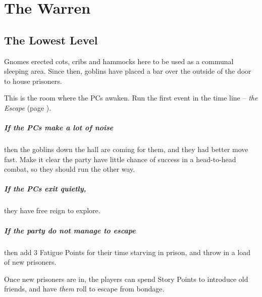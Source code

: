 \chapter{The Warren}

\begin{figure*}[t]
	
\end{figure*}

\section{The Lowest Level}

\begin{multicols}{2}
\setcounter{list}{0}

\label{entrycell}

\begin{exampletext}

	Gnomes erected cots, cribs and hammocks here to be used as a communal sleeping area.
	Since then, goblins have placed a bar over the outside of the door to house prisoners.

\end{exampletext}

This is the room where the PCs awaken.
Run the first event in the time line -- \textit{the Escape} (page \pageref{escape}).

\paragraph{If the PCs make a lot of noise}
then the goblins down the hall are coming for them, and they had better move fast.
Make it clear the party have little chance of success in a head-to-head combat, so they should run the other way.

\paragraph{If the PCs exit quietly,}
they have free reign to explore.

\paragraph{If the party do not manage to escape}
then add 3 Fatigue Points for their time starving in prison, and throw in a load of new prisoners.

Once new prisoners are in, the players can spend Story Points to introduce old friends, and have \textit{them} roll to escape from bondage.


\end{multicols}
